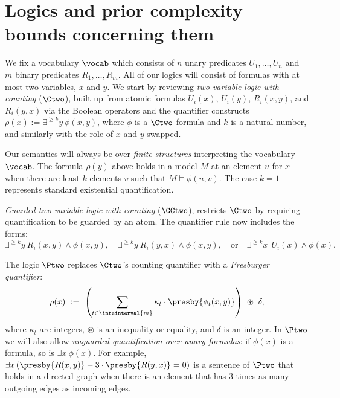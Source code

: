 \section{Logics and prior complexity bounds concerning them}

We fix a vocabulary $\vocab$ which consists of $n$ unary predicates $U_1, \ldots, U_n$ and $m$ binary predicates $R_1, \ldots, R_m$. All of our logics will consist of formulas with at most two variables, $x$ and $y$.
We start by reviewing \emph{two variable logic with counting} ($\Ctwo$), built up from atomic formulas $U_i(x)$, $ U_i(y)$, $R_i(x, y)$, and $R_i(y, x)$
via the Boolean operators and the quantifier constructs
$\rho(x) := \exists^{\geq k} y\ \phi(x,y)$,
where $\phi$ is a $\Ctwo$ formula and $k$ is a natural number, and similarly with the role of $x$ and $y$ swapped.

Our semantics will always be over \emph{finite structures} interpreting the vocabulary $\vocab$.
The formula $\rho(y)$ above holds in a model $M$ at an element $u$ for $x$ when there are least $k$ elements $v$ such that $M \models \phi(u, v)$.
The case $k = 1$ represents standard existential quantification.

\emph{Guarded two variable logic with counting} ($\GCtwo$), restricts $\Ctwo$ by requiring quantification to be guarded by an atom. The quantifier rule now includes the forms:
\begin{equation*}
    \exists^{\geq k} y\ R_i(x, y) \land \phi(x,y),
    \quad
    \exists^{\geq k} y\ R_i(y,x) \land \phi(x,y),
    \quad \text{or} \quad
    \exists^{\geq k} x\ ~ U_i(x) \land \phi(x).
\end{equation*}


The logic $\Ptwo$ replaces $\Ctwo$'s counting quantifier with a \emph{Presburger quantifier}:
\begin{equation*}
    \rho(x)\ :=\ \left(
    \sum_{t \in \intsinterval{m}} \kappa_{t} \cdot \presby{ \phi_t(x,y)}  \right)
    \ \circledast\ \delta,
\end{equation*}
where $\kappa_t$ are integers,
$\circledast$ is an inequality or equality, and $\delta$ is an integer.
In $\Ptwo$ we will also allow \emph{unguarded quantification over unary formulas}: if $\phi(x)$ is a formula, so is
$\exists x\ \phi(x)$.
For example,
$\exists x \left(\presby{R(x,y)} - 3 \cdot \presby{R(y,x)} = 0\right)$
is a sentence of $\Ptwo$ that holds in a directed graph  when there is an element that has 3 times as many outgoing edges as incoming edges.

